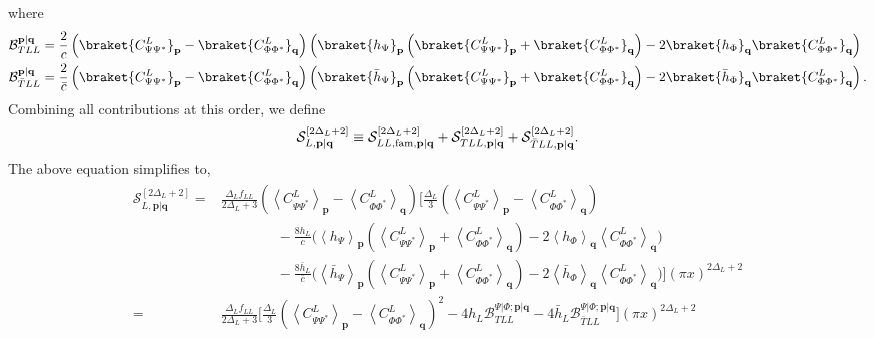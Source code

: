 \documentclass[11pt]{article}
\newcommand{\lb}{\left(}
\newcommand{\rb}{\right)}
\begin{document}
where
\begin{align}
    \mathcal{B}_{TLL}^{\textbf{p}|\textbf{q}} &= \frac{2}{c} \lb \braket{C^L_{\Psi\Psi^*}}_{\textbf{p}} - \braket{C^L_{\Phi\Phi^*}}_{\textbf{q}}\rb \lb \braket{h_\Psi}_\textbf{p} \lb \braket{C^L_{\Psi\Psi^*}}_{\textbf{p}} +\braket{C^L_{\Phi\Phi^*}}_{\textbf{q}}\rb - 2\braket{h_\Phi}_\textbf{q} \braket{C^L_{\Phi\Phi^*}}_\textbf{q} \rb\\
    \mathcal{B}_{\bar TLL}^{\textbf{p}|\textbf{q}} &= \frac{2}{\bar c} \lb \braket{C^L_{\Psi\Psi^*}}_{\textbf{p}} - \braket{C^L_{\Phi\Phi^*}}_{\textbf{q}}\rb \lb \braket{\bar h_\Psi}_\textbf{p} \lb \braket{C^L_{\Psi\Psi^*}}_{\textbf{p}} +\braket{C^L_{\Phi\Phi^*}}_{\textbf{q}}\rb - 2\braket{\bar h_\Phi}_\textbf{q} \braket{C^L_{\Phi\Phi^*}}_\textbf{q} \rb.
\end{align}
Combining all contributions at this order, we define
\begin{align}
    \mathcal S_{L,\mathbf p|\mathbf q}^{[2\Delta_L+2]}
    \equiv
    \mathcal S_{LL,{\rm fam},\mathbf p|\mathbf q}^{[2\Delta_L+2]}
    +
    \mathcal S_{TLL,\mathbf p|\mathbf q}^{[2\Delta_L+2]}
    +
    \mathcal S_{\bar TLL,\mathbf p|\mathbf q}^{[2\Delta_L+2]} .
\end{align}
The above equation simplifies to,
\begin{align}
\begin{aligned}
\mathcal S_{L,\mathbf p|\mathbf q}^{[2\Delta_L+2]}
={}&
\frac{\Delta_L f_{LL}}
{2\Delta_L+3}
\left(
\left\langle C_{\Psi\Psi^*}^{L}\right\rangle_{\mathbf p}
-
\left\langle C_{\Phi\Phi^*}^{L}\right\rangle_{\mathbf q}
\right)
\Bigg[
\frac{\Delta_L}{3}
\left(
\left\langle C_{\Psi\Psi^*}^{L}\right\rangle_{\mathbf p}
-
\left\langle C_{\Phi\Phi^*}^{L}\right\rangle_{\mathbf q}
\right)
\\
&\qquad\qquad
-\frac{8h_L}{c}
\Bigg(
\left\langle h_\Psi\right\rangle_{\mathbf p}
\left(
\left\langle C_{\Psi\Psi^*}^{L}\right\rangle_{\mathbf p}
+
\left\langle C_{\Phi\Phi^*}^{L}\right\rangle_{\mathbf q}
\right)
-
2
\left\langle h_\Phi\right\rangle_{\mathbf q}
\left\langle C_{\Phi\Phi^*}^{L}\right\rangle_{\mathbf q}
\Bigg)
\\
&\qquad\qquad
-\frac{8\bar h_L}{\bar c}
\Bigg(
\left\langle \bar h_\Psi\right\rangle_{\mathbf p}
\left(
\left\langle C_{\Psi\Psi^*}^{L}\right\rangle_{\mathbf p}
+
\left\langle C_{\Phi\Phi^*}^{L}\right\rangle_{\mathbf q}
\right)
-
2
\left\langle \bar h_\Phi\right\rangle_{\mathbf q}
\left\langle C_{\Phi\Phi^*}^{L}\right\rangle_{\mathbf q}
\Bigg)
\Bigg]
(\pi x)^{2\Delta_L+2}\\
={}&  \frac{\Delta_L f_{LL}}
{2\Delta_L+3}\Bigg[
\frac{\Delta_L}{3}
\left(
\left\langle C_{\Psi\Psi^*}^{L}\right\rangle_{\mathbf p}
-
\left\langle C_{\Phi\Phi^*}^{L}\right\rangle_{\mathbf q}
\right)^2 -4h_L\mathcal{B}_{TLL}^{\Psi|\Phi;\textbf{p}|\textbf{q}} -4\bar h_L\mathcal{B}_{\bar TLL}^{\Psi|\Phi;\textbf{p}|\textbf{q}}\Bigg]
(\pi x)^{2\Delta_L+2}
\end{aligned}
\end{align}
\end{document}
